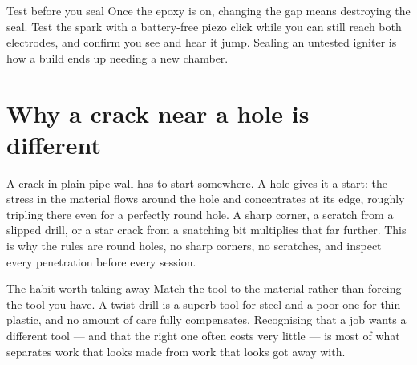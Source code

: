 \begin{gate}{Test before you seal}
Once the epoxy is on, changing the gap means destroying the seal. Test the spark
with a battery-free piezo click while you can still reach both electrodes, and
confirm you see and hear it jump. Sealing an untested igniter is how a build
ends up needing a new chamber.
\end{gate}

\section{Why a crack near a hole is different}
A crack in plain pipe wall has to start somewhere. A hole gives it a start: the
stress in the material flows around the hole and concentrates at its edge,
roughly tripling there even for a perfectly round hole. A sharp corner, a
scratch from a slipped drill, or a star crack from a snatching bit multiplies
that far further. This is why the rules are round holes, no sharp corners, no
scratches, and inspect every penetration before every session.


\begin{telospanel}{The habit worth taking away}
Match the tool to the material rather than forcing the tool you have. A twist
drill is a superb tool for steel and a poor one for thin plastic, and no amount
of care fully compensates. Recognising that a job wants a different tool --- and
that the right one often costs very little --- is most of what separates work
that looks made from work that looks got away with.
\end{telospanel}

